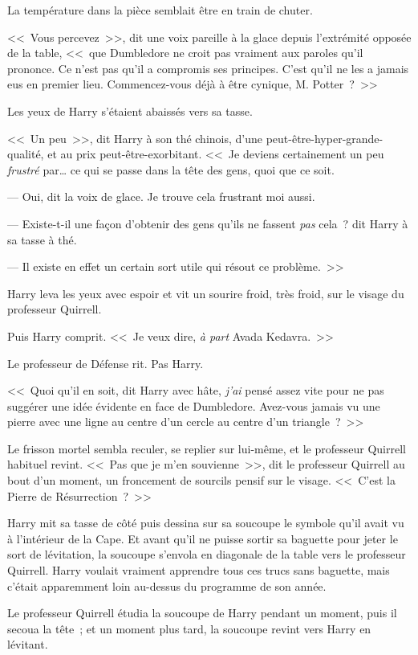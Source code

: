 La température dans la pièce semblait être en train de chuter.

<<~Vous percevez~>>, dit une voix pareille à la glace depuis l'extrémité opposée de la table, <<~que Dumbledore ne croit pas vraiment aux paroles qu'il prononce. Ce n'est pas qu'il a compromis ses principes. C'est qu'il ne les a jamais eus en premier lieu. Commencez-vous déjà à être cynique, M. Potter~?~>>

Les yeux de Harry s'étaient abaissés vers sa tasse.

<<~Un peu~>>, dit Harry à son thé chinois, d'une peut-être-hyper-grande-qualité, et au prix peut-être-exorbitant. <<~Je deviens certainement un peu \emph{frustré} par… ce qui se passe dans la tête des gens, quoi que ce soit.

--- Oui, dit la voix de glace. Je trouve cela frustrant moi aussi.

--- Existe-t-il une façon d'obtenir des gens qu'ils ne fassent \emph{pas} cela~? dit Harry à sa tasse à thé.

--- Il existe en effet un certain sort utile qui résout ce problème.~>>

Harry leva les yeux avec espoir et vit un sourire froid, très froid, sur le visage du professeur Quirrell.

Puis Harry comprit. <<~Je veux dire, \emph{à part} Avada Kedavra.~>>

Le professeur de Défense rit. Pas Harry.

<<~Quoi qu'il en soit, dit Harry avec hâte, \emph{j'ai} pensé assez vite pour ne pas suggérer une idée évidente en face de Dumbledore. Avez-vous jamais vu une pierre avec une ligne au centre d'un cercle au centre d'un triangle~?~>>

Le frisson mortel sembla reculer, se replier sur lui-même, et le professeur Quirrell habituel revint. <<~Pas que je m'en souvienne~>>, dit le professeur Quirrell au bout d'un moment, un froncement de sourcils pensif sur le visage. <<~C'est la Pierre de Résurrection~?~>>

Harry mit sa tasse de côté puis dessina sur sa soucoupe le symbole qu'il avait vu à l'intérieur de la Cape. Et avant qu'il ne puisse sortir sa baguette pour jeter le sort de lévitation, la soucoupe s'envola en diagonale de la table vers le professeur Quirrell. Harry voulait vraiment apprendre tous ces trucs sans baguette, mais c'était apparemment loin au-dessus du programme de son année.

Le professeur Quirrell étudia la soucoupe de Harry pendant un moment, puis il secoua la tête~; et un moment plus tard, la soucoupe revint vers Harry en lévitant.

